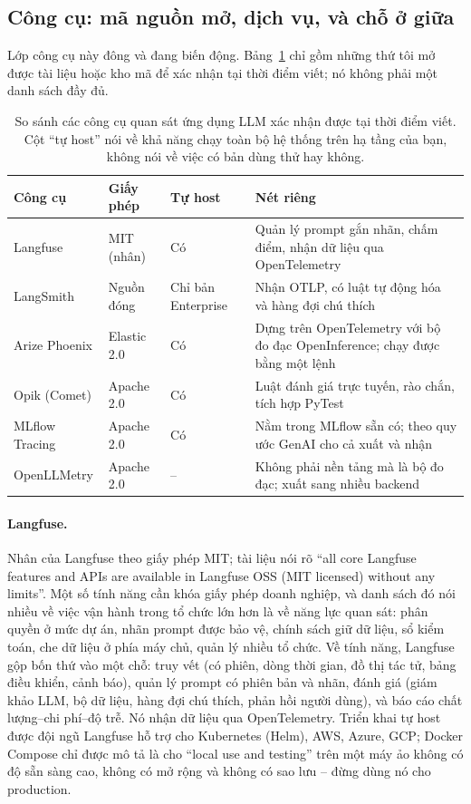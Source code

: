 \subsection{Công cụ: mã nguồn mở, dịch vụ, và chỗ ở giữa}
\label{ssec:obs_tools}

Lớp công cụ này đông và đang biến động. Bảng~\ref{tab:llm_obs_tools} chỉ gồm những thứ tôi mở được tài liệu hoặc kho mã để xác nhận tại thời điểm viết; nó không phải một danh sách đầy đủ.

\begin{table}[H]
\centering
\small
\begin{tabularx}{\textwidth}{@{}lllX@{}}
\toprule
\textbf{Công cụ} & \textbf{Giấy phép} & \textbf{Tự host} & \textbf{Nét riêng} \\
\midrule
Langfuse & MIT (nhân) & Có & Quản lý prompt gắn nhãn, chấm điểm, nhận dữ liệu qua OpenTelemetry \\
LangSmith & Nguồn đóng & Chỉ bản Enterprise & Nhận OTLP, có luật tự động hóa và hàng đợi chú thích \\
Arize Phoenix & Elastic 2.0 & Có & Dựng trên OpenTelemetry với bộ đo đạc OpenInference; chạy được bằng một lệnh \\
Opik (Comet) & Apache 2.0 & Có & Luật đánh giá trực tuyến, rào chắn, tích hợp PyTest \\
MLflow Tracing & Apache 2.0 & Có & Nằm trong MLflow sẵn có; theo quy ước GenAI cho cả xuất và nhận \\
OpenLLMetry & Apache 2.0 & -- & Không phải nền tảng mà là bộ đo đạc; xuất sang nhiều backend \\
\bottomrule
\end{tabularx}
\caption{So sánh các công cụ quan sát ứng dụng LLM xác nhận được tại thời điểm viết. Cột ``tự host'' nói về khả năng chạy toàn bộ hệ thống trên hạ tầng của bạn, không nói về việc có bản dùng thử hay không.}
\label{tab:llm_obs_tools}
\end{table}

\paragraph{Langfuse.} Nhân của Langfuse theo giấy phép MIT; tài liệu nói rõ ``all core Langfuse features and APIs are available in Langfuse OSS (MIT licensed) without any limits''. Một số tính năng cần khóa giấy phép doanh nghiệp, và danh sách đó nói nhiều về việc vận hành trong tổ chức lớn hơn là về năng lực quan sát: phân quyền ở mức dự án, nhãn prompt được bảo vệ, chính sách giữ dữ liệu, sổ kiểm toán, che dữ liệu ở phía máy chủ, quản lý nhiều tổ chức. Về tính năng, Langfuse gộp bốn thứ vào một chỗ: truy vết (có phiên, dòng thời gian, đồ thị tác tử, bảng điều khiển, cảnh báo), quản lý prompt có phiên bản và nhãn, đánh giá (giám khảo LLM, bộ dữ liệu, hàng đợi chú thích, phản hồi người dùng), và báo cáo chất lượng--chi phí--độ trễ. Nó nhận dữ liệu qua OpenTelemetry. Triển khai tự host được đội ngũ Langfuse hỗ trợ cho Kubernetes (Helm), AWS, Azure, GCP; Docker Compose chỉ được mô tả là cho ``local use and testing'' trên một máy ảo không có độ sẵn sàng cao, không có mở rộng và không có sao lưu -- đừng dùng nó cho production.

